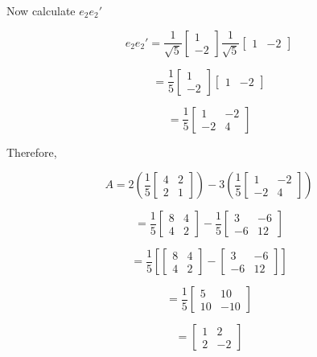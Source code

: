\documentclass[12pt]{article}
\begin{document}
\noindent
Now calculate \(e_2e_2'\)

\[
e_2e_2'
=
\frac{1}{\sqrt{5}}
\begin{bmatrix}
1\\
-2
\end{bmatrix}
\frac{1}{\sqrt{5}}
\begin{bmatrix}
1 & -2
\end{bmatrix}
\]

\[
=
\frac{1}{5}
\begin{bmatrix}
1\\
-2
\end{bmatrix}
\begin{bmatrix}
1 & -2
\end{bmatrix}
\]

\[
=
\frac{1}{5}
\begin{bmatrix}
1 & -2\\
-2 & 4
\end{bmatrix}
\]

\noindent
Therefore,

\[
A
=
2
\left(
\frac{1}{5}
\begin{bmatrix}
4 & 2\\
2 & 1
\end{bmatrix}
\right)
-
3
\left(
\frac{1}{5}
\begin{bmatrix}
1 & -2\\
-2 & 4
\end{bmatrix}
\right)
\]

\[
=
\frac{1}{5}
\begin{bmatrix}
8 & 4\\
4 & 2
\end{bmatrix}
-
\frac{1}{5}
\begin{bmatrix}
3 & -6\\
-6 & 12
\end{bmatrix}
\]

\[
=
\frac{1}{5}
\left[
\begin{bmatrix}
8 & 4\\
4 & 2
\end{bmatrix}
-
\begin{bmatrix}
3 & -6\\
-6 & 12
\end{bmatrix}
\right]
\]

\[
=
\frac{1}{5}
\begin{bmatrix}
5 & 10\\
10 & -10
\end{bmatrix}
\]

\[
=
\begin{bmatrix}
1 & 2\\
2 & -2
\end{bmatrix}
\]
\end{document}
